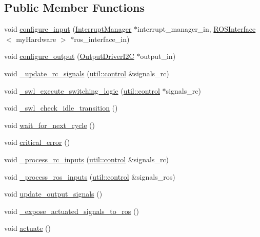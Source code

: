 \subsection*{Public Member Functions}
\begin{DoxyCompactItemize}
\item 
void \hyperlink{classSPMB_1_1StateMachine_a435a2eb92508aa038a0df64b4edd3ff2}{configure\+\_\+input} (\hyperlink{classSPMB_1_1InterruptManager}{Interrupt\+Manager} $\ast$interrupt\+\_\+manager\+\_\+in, \hyperlink{classSPMB_1_1ROSInterface}{R\+O\+S\+Interface}$<$ my\+Hardware $>$ $\ast$ros\+\_\+interface\+\_\+in)
\item 
void \hyperlink{classSPMB_1_1StateMachine_a1e1f84c67c0db8422a17c6d0f76f70a8}{configure\+\_\+output} (\hyperlink{classSPMB_1_1OutputDriverI2C}{Output\+Driver\+I2C} $\ast$output\+\_\+in)
\item 
void \hyperlink{classSPMB_1_1StateMachine_af1812d19f20f020a1635a96da3e8e048}{\+\_\+update\+\_\+rc\+\_\+signals} (\hyperlink{structSPMB_1_1util_1_1control}{util\+::control} \&signals\+\_\+rc)
\item 
void \hyperlink{classSPMB_1_1StateMachine_a1c01752d1ec267a1dc85924d453db6ce}{\+\_\+swl\+\_\+execute\+\_\+switching\+\_\+logic} (\hyperlink{structSPMB_1_1util_1_1control}{util\+::control} $\ast$signals\+\_\+rc)
\item 
void \hyperlink{classSPMB_1_1StateMachine_aefec64633728ccc393ff10752fe76243}{\+\_\+swl\+\_\+check\+\_\+idle\+\_\+transition} ()
\item 
void \hyperlink{classSPMB_1_1StateMachine_ad5b8e99beb2d19a29491429c45249179}{wait\+\_\+for\+\_\+next\+\_\+cycle} ()
\item 
void \hyperlink{classSPMB_1_1StateMachine_a8e7447f352e2a9b3f8d451bc834faaa2}{critical\+\_\+error} ()
\item 
void \hyperlink{classSPMB_1_1StateMachine_a46daaffbfb6385c230685dcba703314f}{\+\_\+process\+\_\+rc\+\_\+inputs} (\hyperlink{structSPMB_1_1util_1_1control}{util\+::control} \&signals\+\_\+rc)
\item 
void \hyperlink{classSPMB_1_1StateMachine_a6ffc09455280e241a558f1b46441aa9d}{\+\_\+process\+\_\+ros\+\_\+inputs} (\hyperlink{structSPMB_1_1util_1_1control}{util\+::control} \&signals\+\_\+ros)
\item 
void \hyperlink{classSPMB_1_1StateMachine_a651fcd0d71e1ce2ec7dfc72255ff8af7}{update\+\_\+output\+\_\+signals} ()
\item 
void \hyperlink{classSPMB_1_1StateMachine_a887475df9c15df2defce01f36030f931}{\+\_\+expose\+\_\+actuated\+\_\+signals\+\_\+to\+\_\+ros} ()
\item 
void \hyperlink{classSPMB_1_1StateMachine_a46d01bf4a019982fee4188d7434e38fa}{actuate} ()
\end{DoxyCompactItemize}
